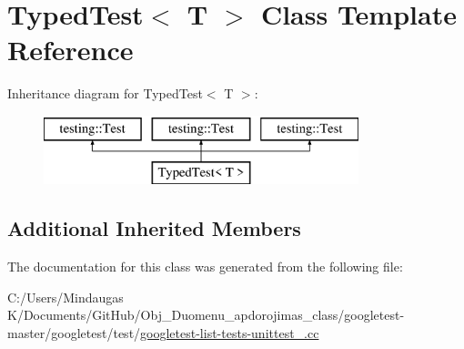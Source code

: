 \hypertarget{class_typed_test}{}\section{Typed\+Test$<$ T $>$ Class Template Reference}
\label{class_typed_test}
Inheritance diagram for Typed\+Test$<$ T $>$\+:\begin{figure}[H]
\begin{center}
\leavevmode
\includegraphics[height=2.000000cm]{d0/de9/class_typed_test}
\end{center}
\end{figure}
\subsection*{Additional Inherited Members}


The documentation for this class was generated from the following file\+:\begin{DoxyCompactItemize}
\item 
C\+:/\+Users/\+Mindaugas K/\+Documents/\+Git\+Hub/\+Obj\+\_\+\+Duomenu\+\_\+apdorojimas\+\_\+class/googletest-\/master/googletest/test/\mbox{\hyperlink{googletest-master_2googletest_2test_2googletest-list-tests-unittest___8cc}{googletest-\/list-\/tests-\/unittest\+\_\+.\+cc}}\end{DoxyCompactItemize}
